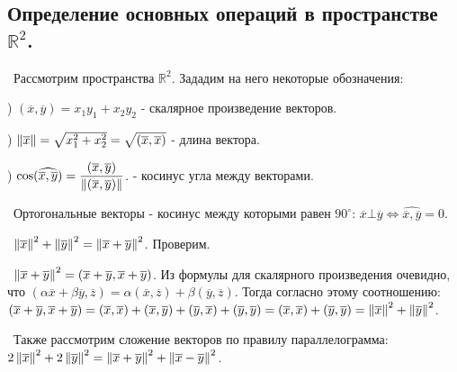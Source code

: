 \subsection*{Определение основных операций в пространстве $\mathbb{R}^2$. }

\noindent \textbullet~Рассмотрим пространства $\mathbb{R}^2$. Зададим на него некоторые обозначения:

) $(\overline{x}, \overline{y}) = x_1 y_1 + x_2 y_2$ - скалярное произведение векторов.

) $\left\lVert\overline{x}\right\rVert = \sqrt{x_1^2 + x_2^2} = \sqrt{(\overline{x}, \overline{x})}$ - длина вектора.

) $\cos(\widehat{\overline{x}, \overline{y}}) = \dfrac{(\overline{x}, \overline{y})}{\left\lVert(\overline{x}, \overline{y})\right\rVert}$. - косинус угла между векторами.

\smallskip
\noindent \textasteriskcentered~Ортогональные векторы - косинус между которыми равен $90^\circ$: 
$\overline{x} \bot \overline{y} \Longleftrightarrow \widehat{\overline{x}, \overline{y}} = 0$.

\medskip
{}

\medskip
\noindent \textbullet~$\left\lVert\overline{x}\right\rVert^2 + \left\lVert\overline{y}\right\rVert^2 = \left\lVert\overline{x} + \overline{y}\right\rVert^2$. Проверим.

\smallskip 
\noindent \textbullet~$\left\lVert\overline{x} + \overline{y}\right\rVert^2 = (\overline{x} + \overline{y}, \overline{x} + \overline{y})$. Из формулы для скалярного произведения 
очевидно, что $(\alpha\overline{x} + \beta \overline{y}, \overline{z}) = \alpha(\overline{x}, \overline{z}) + \beta (\overline{y}, \overline{z})$. Тогда согласно 
этому соотношению: $(\overline{x} + \overline{y}, \overline{x} + \overline{y}) = (\overline{x}, \overline{x}) + (\overline{x}, \overline{y}) +
(\overline{y}, \overline{x}) + (\overline{y}, \overline{y}) = (\overline{x}, \overline{x}) + (\overline{y}, \overline{y}) = \left\lVert\overline{x}\right\rVert^2 +
\left\lVert\overline{y}\right\rVert^2$.

\medskip 
\noindent \textbullet~Также рассмотрим сложение векторов по правилу параллелограмма:
$2\left\lVert\overline{x}\right\rVert^2 + 2\left\lVert\overline{y}\right\rVert^2 = \left\lVert\overline{x} + \overline{y}\right\rVert^2 + \left\lVert\overline{x} - \overline{y}\right\rVert^2$.

